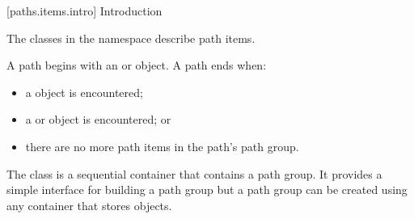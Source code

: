 
 [paths.items.intro] {Introduction}

\pnum
The classes in the  namespace describe path items.

\pnum
A path begins with an  or  object. A path ends when:

\begin{itemize}
\item a  object is encountered;
\item a  or  object is encountered; or
\item there are no more path items in the path's path group.
\end{itemize}

\pnum
The  class is a sequential container that contains a path group. It provides a simple interface for building a path group but a path group can be created using any container that stores  objects.
